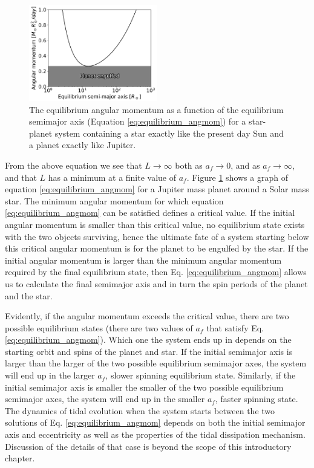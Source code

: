 \begin{figure}[t]
%
    \centering
%
    \includegraphics[width=0.5\textwidth]{equilibrium_angmom.pdf}
%
    \caption{
%
        The equilibrium angular momentum as a function of the equilibrium
        semimajor axis (Equation \eqref{eq:equilibrium_angmom}) for a
        star-planet system containing a star exactly like the present day Sun
        and a planet exactly like Jupiter.
%
    }
%
    \label{fig:equilibrium_angmom}
%
\end{figure}


From the above equation we see that $L \rightarrow \infty$ both as $a_f
\rightarrow 0$, and as $a_f \rightarrow \infty$, and that $L$ has a minimum
at a finite value of $a_f$. Figure \ref{fig:equilibrium_angmom} shows a graph of
equation \eqref{eq:equilibrium_angmom} for a Jupiter mass planet around a Solar
mass star. The minimum angular momentum for which equation
\eqref{eq:equilibrium_angmom} can be satisfied defines a critical value.  If the
initial angular momentum is smaller than this critical value, no equilibrium
state exists with the two objects surviving, hence the ultimate fate of a system
starting below this critical angular momentum is for the planet to be engulfed
by the star. If the initial angular momentum is larger than the minimum angular
momentum required by the final equilibrium state, then Eq.
\eqref{eq:equilibrium_angmom} allows us to calculate the final semimajor axis
and in turn the spin periods of the planet and the star.

Evidently, if the angular momentum exceeds the critical value, there are two
possible equilibrium states (there are two values of $a_f$ that satisfy Eq.
\eqref{eq:equilibrium_angmom}). Which one the system ends up in depends on the
starting orbit and spins of the planet and star. If the initial semimajor axis
is larger than the larger of the two possible equilibrium semimajor axes, the
system will end up in the larger $a_f$, slower spinning equilibrium state.
Similarly, if the initial semimajor axis is smaller the smaller of the two
possible equilibrium semimajor axes, the system will end up in the smaller
$a_f$, faster spinning state. The dynamics of tidal evolution when the system
starts between the two solutions of Eq. \eqref{eq:equilibrium_angmom} depends on
both the initial semimajor axis and eccentricity as well as the properties of
the tidal dissipation mechanism. Discussion of the details of that case is
beyond the scope of this introductory chapter.

